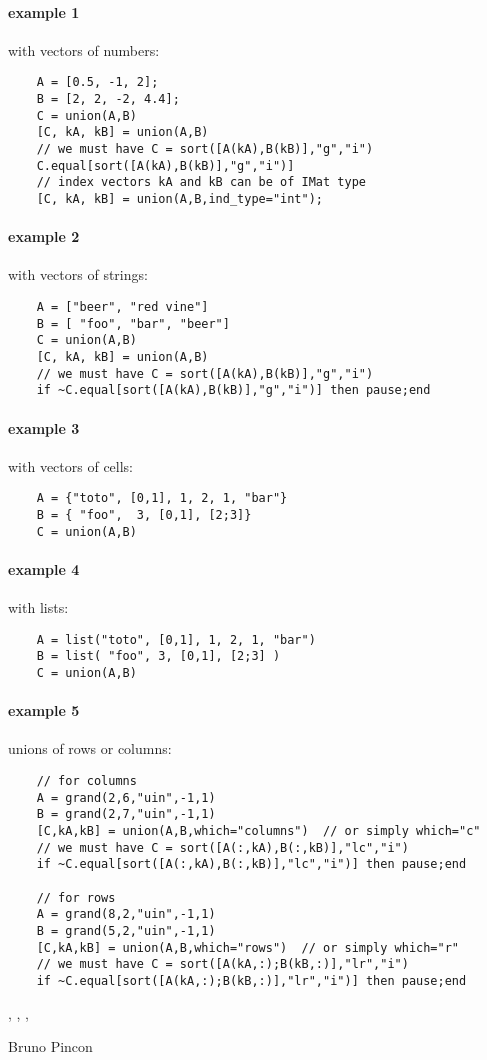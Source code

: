 \begin{examples}
  \paragraph{example 1} with vectors of numbers:
  \begin{Verbatim}
    A = [0.5, -1, 2];
    B = [2, 2, -2, 4.4];
    C = union(A,B)
    [C, kA, kB] = union(A,B)
    // we must have C = sort([A(kA),B(kB)],"g","i")
    C.equal[sort([A(kA),B(kB)],"g","i")]
    // index vectors kA and kB can be of IMat type
    [C, kA, kB] = union(A,B,ind_type="int");
  \end{Verbatim}

  \paragraph{example 2} with vectors of strings:
  \begin{Verbatim}
    A = ["beer", "red vine"]
    B = [ "foo", "bar", "beer"]
    C = union(A,B)
    [C, kA, kB] = union(A,B)
    // we must have C = sort([A(kA),B(kB)],"g","i")
    if ~C.equal[sort([A(kA),B(kB)],"g","i")] then pause;end
  \end{Verbatim}

  \paragraph{example 3} with vectors of cells:
  \begin{Verbatim}
    A = {"toto", [0,1], 1, 2, 1, "bar"}
    B = { "foo",  3, [0,1], [2;3]}
    C = union(A,B)
  \end{Verbatim}
  \paragraph{example 4} with lists:
  \begin{Verbatim}
    A = list("toto", [0,1], 1, 2, 1, "bar")
    B = list( "foo", 3, [0,1], [2;3] )
    C = union(A,B)
  \end{Verbatim}
  \paragraph{example 5} unions of rows or columns:
  \begin{Verbatim}
    // for columns
    A = grand(2,6,"uin",-1,1)
    B = grand(2,7,"uin",-1,1)
    [C,kA,kB] = union(A,B,which="columns")  // or simply which="c"
    // we must have C = sort([A(:,kA),B(:,kB)],"lc","i")
    if ~C.equal[sort([A(:,kA),B(:,kB)],"lc","i")] then pause;end
    
    // for rows
    A = grand(8,2,"uin",-1,1)
    B = grand(5,2,"uin",-1,1)
    [C,kA,kB] = union(A,B,which="rows")  // or simply which="r"
    // we must have C = sort([A(kA,:);B(kB,:)],"lr","i")
    if ~C.equal[sort([A(kA,:);B(kB,:)],"lr","i")] then pause;end
  \end{Verbatim}
\end{examples}

\begin{manseealso}
  , ,
  , 
\end{manseealso}
\begin{authors}
  Bruno Pincon
\end{authors}
